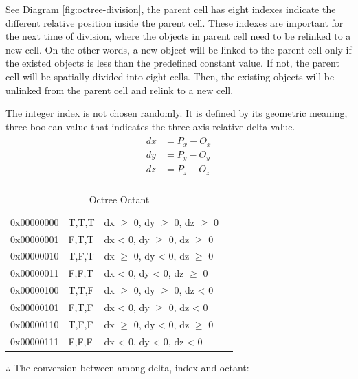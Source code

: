 See Diagram \ref{fig:octree-division}, the parent cell has eight indexes indicate the different relative position inside the parent cell. These indexes are important for the next time of division, where the objects in parent cell need to be relinked to a new cell. On the other words, a new object will be linked to the parent cell only if the existed objects is less than the predefined constant value. If not, the parent cell will be spatially divided into eight cells. Then, the existing objects will be unlinked from the parent cell and relink to a new cell.

The integer index is not chosen randomly. It is defined by its geometric meaning, three boolean value that indicates the three axis-relative delta value.
\[
\begin{array}{lr}
\begin{aligned}
dx &= P_x - O_x\\
dy &= P_y - O_y\\
dz &= P_z - O_z\\
\end{aligned}
\end{array}
\]

\begin{table}[H]
\caption{Octree Octant}
\label{tab:octree-octant}
\centering
	\begin{tabular}{l l l l}
	\toprule
	\tabhead{Binary Index} & \tabhead{Octant} & \tabhead{Geometric Meaning}\\
	\midrule
	0x00000000 & T,\;T,\;T & dx $\geqslant$ 0, dy $\geqslant$ 0, dz $\geqslant$ 0\\
	0x00000001 & F,\;T,\;T & dx < 0, dy $\geqslant$ 0, dz $\geqslant$ 0\\
	0x00000010 & T,\;F,\;T & dx $\geqslant$ 0, dy < 0, dz $\geqslant$ 0\\
	0x00000011 & F,\;F,\;T & dx < 0, dy < 0, dz $\geqslant$ 0\\
	0x00000100 & T,\;T,\;F & dx $\geqslant$ 0, dy $\geqslant$ 0, dz < 0\\
	0x00000101 & F,\;T,\;F & dx < 0, dy $\geqslant$ 0, dz < 0\\
	0x00000110 & T,\;F,\;F & dx $\geqslant$ 0, dy < 0, dz $\geqslant$ 0\\
	0x00000111 & F,\;F,\;F & dx < 0, dy < 0, dz < 0\\
	\bottomrule
	\end{tabular}
\end{table}

$\therefore$ The conversion between among delta, index and octant:

